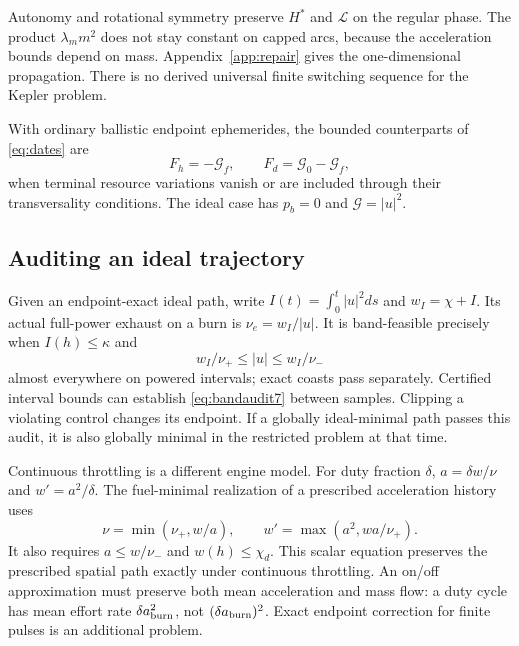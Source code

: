 Autonomy and rotational symmetry preserve $H^*$ and $\mathcal L$
on the regular phase. The product $\lambda_m m^2$ does not stay
constant on capped arcs, because the acceleration bounds depend on
mass. Appendix~\ref{app:repair} gives the one-dimensional propagation. There is no derived universal finite
switching sequence for the Kepler problem.

With ordinary ballistic endpoint ephemerides, the bounded counterparts
of \eqref{eq:dates} are
\begin{equation}
 F_h=-\mathcal G_f,\qquad
 F_d=\mathcal G_0-\mathcal G_f,
 \label{eq:boundeddate}
\end{equation}
when terminal resource variations vanish or are included through their
transversality conditions. The ideal case has $p_b=0$ and
$\mathcal G=|u|^2$.

\subsection{Auditing an ideal trajectory}
Given an endpoint-exact ideal path, write
$I(t)=\int_0^t|u|^2ds$ and $w_I=\chi+I$. Its actual full-power exhaust
on a burn is $\nu_e=w_I/|u|$. It is band-feasible precisely when
$I(h)\le\kappa$ and
\begin{equation}
 w_I/\nu_+\le|u|\le w_I/\nu_-
 \label{eq:bandaudit7}
\end{equation}
almost everywhere on powered intervals; exact coasts pass separately.
Certified interval bounds can establish \eqref{eq:bandaudit7}
between samples. Clipping a violating control changes its endpoint.
If a globally ideal-minimal path passes this audit, it is also globally
minimal in the restricted problem at that time.

Continuous throttling is a different engine model. For duty fraction
$\delta$, $a=\delta w/\nu$ and $w'=a^2/\delta$.
The fuel-minimal realization of a prescribed acceleration history uses
\begin{equation}
 \nu=\min(\nu_+,w/a),\qquad
 w'=\max(a^2,wa/\nu_+).
 \label{eq:throttle}
\end{equation}
It also requires $a\le w/\nu_-$ and $w(h)\le\chi_d$.
This scalar equation preserves the prescribed spatial path exactly
under continuous throttling. An on/off approximation must preserve
both mean acceleration and mass flow: a duty cycle has mean effort
rate $\delta a_{\rm burn}^2$, not $(\delta a_{\rm burn})^2$.
Exact endpoint correction for finite pulses is an additional problem.

